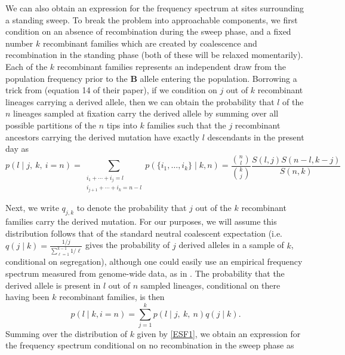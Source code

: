 \documentclass[a4paper,10pt]{article}
\begin{document}
We can also obtain an expression for the frequency spectrum at sites surrounding a standing sweep. To break the problem into approachable components, we first condition on an absence of recombination during the sweep phase, and a fixed number $k$ recombinant families which are created by coalescence and recombination in the standing phase (both of these will be relaxed momentarily). Each of the $k$ recombinant families represents an independent draw from the population frequency prior to the \textbf{B} allele entering the population. Borrowing a trick from \cite{Pennings:2006fs} (equation 14 of their paper), if we condition on $j$ out of $k$ recombinant lineages carrying a derived allele, then we can obtain the probability that $l$ of the $n$ lineages sampled at fixation carry the derived allele by summing over all possible partitions of the $n$ tips into $k$ families such that the $j$ recombinant ancestors carrying the derived mutation have exactly $l$ descendants in the present day as
\begin{equation}
p(l \mid j, ~k,~i=n) = \sum_{\substack{i_1+\cdots +i_j=l \\i_{j+1}+\cdots + i_k=n-l}} p(\{i_1,\dots,i_k\} \mid k, n) = \frac{ {n \choose l} }{ {k \choose j} }\frac{ S(l,j)  S(n-l,k-j)  }{ S(n,k) } \label{ESF_gives_freq_spec}
\end{equation}

Next, we write $q_{j,k}$ to denote the probability that $j$ out of the $k$ recombinant families carry the derived mutation. For our purposes, we will assume this distribution follows that of the standard neutral coalescent expectation (i.e. $q(j \mid k) = \frac{1/j}{\sum_{\ell=1}^{k-1}1/\ell}$ gives the probability of $j$ derived alleles in a sample of $k$, conditional on segregation), although one could easily use an empirical frequency spectrum measured from genome-wide data, as in \citep{NielsenKim}. The probability that the derived allele is present in $l$ out of $n$ sampled lineages, conditional on there having been $k$ recombinant families, is then 
\begin{equation}
	p(l \mid k, i = n ) = \sum_{j=1}^k p(l \mid j,~k, ~n)q(j\mid k).
\end{equation}	
Summing over the distribution of $k$ given by \eqref{ESF1}, we obtain an expression for the frequency spectrum conditional on no recombination in the sweep phase as
\end{document}

